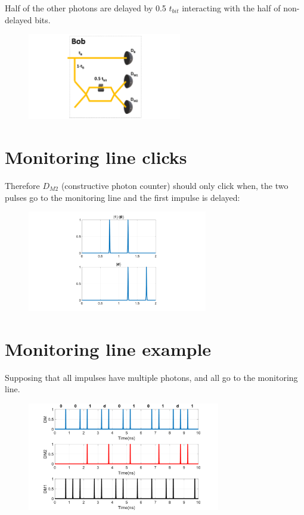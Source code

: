 \documentclass[1000pt]{article}
\newcommand{\mysection}[1]{\section*{\color{black}\sffamily #1}}%
\begin{document}
Half of the other photons are delayed by 0.5 $t_{bit}$ interacting with the half of non-delayed bits.
    \begin{figure}[hbt]
    	\centering
    	\includegraphics[width=0.6\textwidth]{./figures/B.pdf}
    \end{figure}
\mysection{\Huge\textbf{Monitoring line clicks}} \Large \vspace*{1cm}

Therefore $D_{M2}$ (constructive photon counter) should only click when, the two pulses go to the monitoring line and the first impulse is delayed:
    \begin{figure}[hbt]
    	\centering
    	\includegraphics[width=0.7\textwidth]{./figures/S2.pdf}
    \end{figure}

\mysection{\Huge\textbf{Monitoring line example}} \Large \vspace*{1cm}

Supposing that all impulses have multiple photons, and all go to the monitoring line.

  \begin{figure}[hbt]
    	\centering
    	\includegraphics[width=0.75\textwidth]{./figures/DM3.pdf}
    \end{figure}
\end{document}
